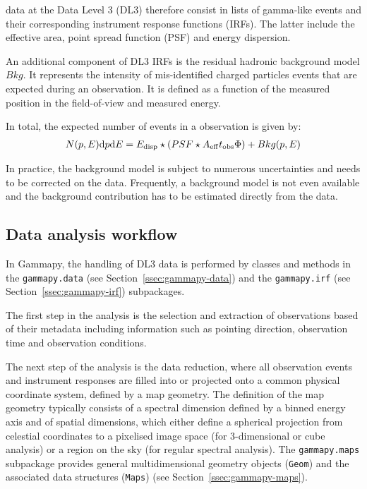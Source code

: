 \documentclass[traditabstract, longauth]{aa}
\newcommand{\code}[1]{\texttt{#1}}
\begin{document}
\gammaray data at the Data Level 3 (DL3) therefore consist in lists of gamma-like events and their
corresponding instrument response functions (IRFs). The latter include the effective area,
point spread function (PSF) and energy dispersion.

An additional component of DL3 IRFs is the residual hadronic background model $Bkg$.
It represents the  intensity of mis-identified charged particles events that are expected
during an observation. It is defined as a function of the measured position in the field-of-view
and measured energy.

In total, the expected number of events in a \gammaray observation is given by:
\begin{align}
N(p, E) {\rm d}p {\rm d}E =  E_{\rm disp} \star (PSF \star A_{\rm eff} t_{\rm obs} \Phi) + Bkg(p, E)
\end{align}

In practice, the background model is subject to numerous uncertainties and needs to be corrected on the data.
Frequently, a background model is not even available and the background contribution has to be estimated
directly from the data.

\subsection{Data analysis workflow}

In Gammapy, the handling of DL3 data is performed by classes and methods
in the \code{gammapy.data} (see Section~\ref{ssec:gammapy-data}) and the \code{gammapy.irf}
(see Section~\ref{ssec:gammapy-irf}) subpackages.

The first step in the analysis is the selection and extraction of observations
based of their metadata including information such as pointing direction, observation
time and observation conditions.

The next step of the analysis is the data reduction, where all observation events and instrument
responses are filled into or projected onto a common physical coordinate system, defined by
a map geometry. The definition of the map geometry typically consists of a spectral dimension
defined by a binned energy axis and of spatial dimensions, which either define 
a spherical projection from celestial coordinates to a pixelised image space
(for 3-dimensional or cube analysis) or a region on the sky (for regular spectral analysis).
The \code{gammapy.maps} subpackage provides general multidimensional geometry objects
(\code{Geom}) and the associated data structures (\code{Maps}) (see Section~\ref{ssec:gammapy-maps}).
\end{document}
